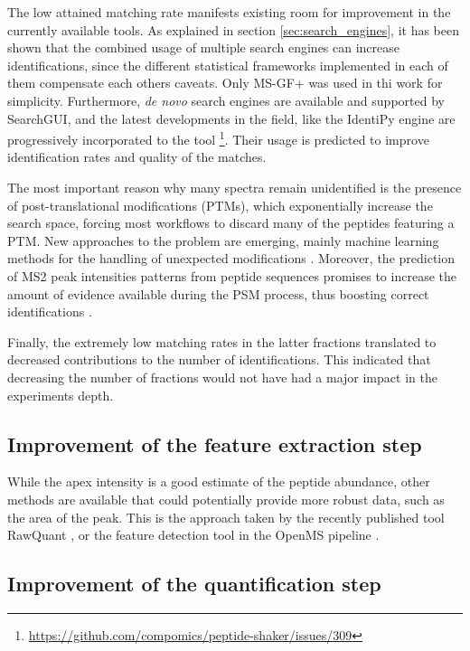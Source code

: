 \documentclass[11pt, a4paper]{report}
\begin{document}
The low attained matching rate manifests existing room for improvement in the currently available tools. As explained in section \ref{sec:search_engines}, it has been shown that the combined usage of multiple search engines can increase identifications, since the different statistical frameworks implemented in each of them compensate each other\textquotesingle s caveats. Only MS-GF+ was used in thi work for simplicity. Furthermore, \textit{de novo} search engines are available and supported by SearchGUI, and the latest developments in the field, like the IdentiPy engine \cite{Levitsky2018} are progressively incorporated to the tool \footnote{\href{https://github.com/compomics/peptide-shaker/issues/309}{https://github.com/compomics/peptide-shaker/issues/309}}. Their usage is predicted to improve identification rates and quality of the matches.

The most important reason why many spectra remain unidentified is the presence of post-translational modifications (\ac{PTM}s), which exponentially increase the search space, forcing most workflows to discard many of the peptides featuring a PTM. New approaches to the problem are emerging, mainly machine learning methods for the handling of unexpected modifications \cite{Gabriels}. Moreover, the prediction of \ac{MS2} peak intensities patterns from peptide sequences promises to increase the amount of evidence available during the PSM process, thus boosting correct identifications \cite{Kirik2018} \cite{Degroeve2013}.

Finally, the extremely low matching rates in the latter fractions translated to decreased contributions to the number of identifications. This indicated that decreasing the number of fractions would not have had a major impact in the experiment\textquotesingle s depth.

\subsection{Improvement of the feature extraction step}

While the apex intensity is a good estimate of the peptide abundance, other methods are available that could potentially provide more robust data, such as the area of the peak. This is the approach taken by the recently published tool RawQuant \cite{Kovalchik2018}, or the feature detection tool in the OpenMS pipeline \cite{Sturm2008}. 

\subsection{Improvement of the quantification step}
\end{document}
